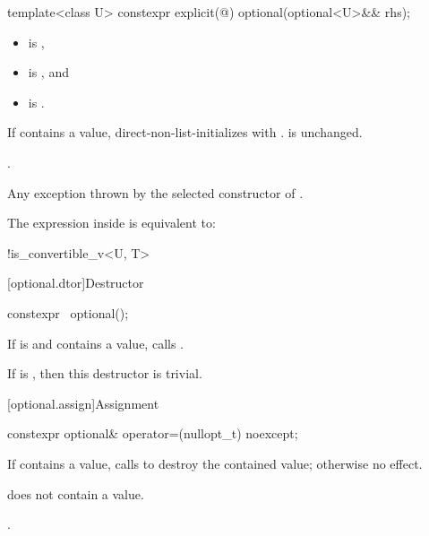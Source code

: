 %
\begin{itemdecl}
template<class U>
  constexpr explicit(@\seebelow@) optional(optional<U>&& rhs);
\end{itemdecl}

\begin{itemdescr}
\pnum
\constraints
\begin{itemize}
\item {} is ,
\item {} is , and
\item {} is .
\end{itemize}

\pnum
\effects
If  contains a value, direct-non-list-initializes  with .  is unchanged.

\pnum
\ensures
{}.

\pnum
\throws
Any exception thrown by the selected constructor of .

\pnum
\remarks
The expression inside  is equivalent to:
\begin{codeblock}
!is_convertible_v<U, T>
\end{codeblock}
\end{itemdescr}

[optional.dtor]{Destructor}

%
\begin{itemdecl}
constexpr ~optional();
\end{itemdecl}

\begin{itemdescr}
\pnum
\effects
If  is  and  contains a value, calls .

\pnum
\remarks
If  is , then this destructor is trivial.
\end{itemdescr}

[optional.assign]{Assignment}

%
\begin{itemdecl}
constexpr optional& operator=(nullopt_t) noexcept;
\end{itemdecl}

\begin{itemdescr}
\pnum
\effects
If  contains a value, calls  to destroy the contained value; otherwise no effect.

\pnum
\ensures
{} does not contain a value.

\pnum
\returns
{}.
\end{itemdescr}

